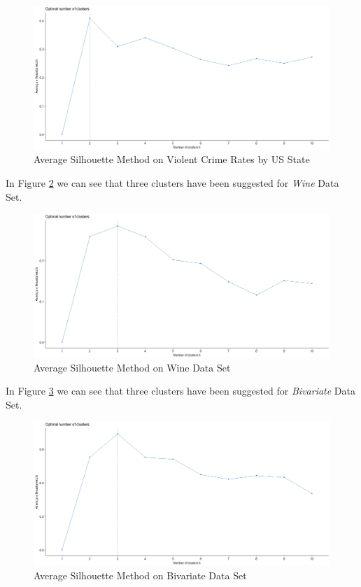 \begin{itemize}
\begin{figure}[h!]
  \centering
  \includegraphics[scale=1.3]{figures/results/USArrests/silhouette.png}
  \caption{Average Silhouette Method on Violent Crime Rates by US State}
  \label{fig:silhoutte5}
\end{figure}

\newpage

In Figure \ref{fig:silhoutte6} we can see that three clusters have been suggested for \textit{Wine} Data Set.

\begin{figure}[h!]
  \centering
  \includegraphics[scale=1.3]{figures/results/wine/silhouette.png}
  \caption{Average Silhouette Method on Wine Data Set}
  \label{fig:silhoutte6}
\end{figure}

\vspace{15mm}

In Figure \ref{fig:silhoutte7} we can see that three clusters have been suggested for \textit{Bivariate} Data Set.

\begin{figure}[h!]
  \centering
  \includegraphics[scale=1.3]{figures/results/xclara/silhouette.png}
  \caption{Average Silhouette Method on Bivariate Data Set}
  \label{fig:silhoutte7}
\end{figure}


\end{itemize}
